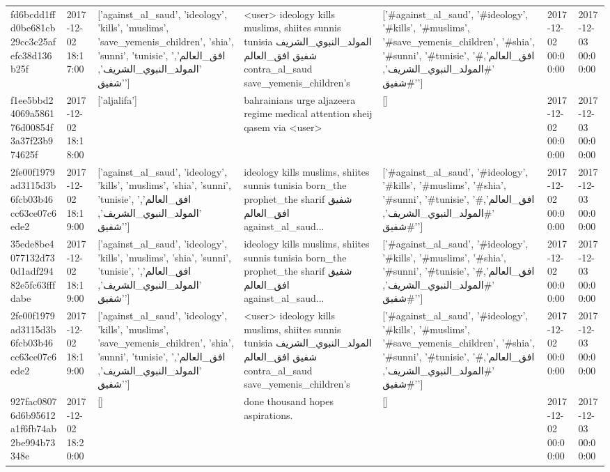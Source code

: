\begin{tabular}{lllllll}
fd6bcdd1ffd0be681cb29cc3c25afefc38d136b25f & 2017-12-02 18:17:00 & ['against_al_saud', 'ideology', 'kills', 'muslims', 'save_yemenis_children', 'shia', 'sunni', 'tunisie', 'افق_العالم', 'المولد_النبوي_الشريف', 'شفيق'] & <user> ideology kills muslims, shiites sunnis tunisia المولد\_النبوي\_الشريف شفيق افق\_العالم contra\_al\_saud save\_yemenis\_children's & ['#against_al_saud', '#ideology', '#kills', '#muslims', '#save_yemenis_children', '#shia', '#sunni', '#tunisie', '#افق_العالم', '#المولد_النبوي_الشريف', '#شفيق'] & 2017-12-02 00:00:00 & 2017-12-03 00:00:00 \\
f1ee5bbd24069a586176d00854f3a37f23b974625f & 2017-12-02 18:18:00 & ['aljalifa'] & bahrainians urge aljazeera regime medical attention sheij qasem via <user> & [] & 2017-12-02 00:00:00 & 2017-12-03 00:00:00 \\
2fe00f1979ad3115d3b6fcb03b46cc63ce07c6ede2 & 2017-12-02 18:19:00 & ['against_al_saud', 'ideology', 'kills', 'muslims', 'shia', 'sunni', 'tunisie', 'افق_العالم', 'المولد_النبوي_الشريف', 'شفيق'] & ideology kills muslims, shiites sunnis tunisia born\_the prophet\_the sharif شفيق افق\_العالم against\_al\_saud... & ['#against_al_saud', '#ideology', '#kills', '#muslims', '#shia', '#sunni', '#tunisie', '#افق_العالم', '#المولد_النبوي_الشريف', '#شفيق'] & 2017-12-02 00:00:00 & 2017-12-03 00:00:00 \\
35ede8be4077132d730d1adf29482e5fc63fffdabe & 2017-12-02 18:19:00 & ['against_al_saud', 'ideology', 'kills', 'muslims', 'shia', 'sunni', 'tunisie', 'افق_العالم', 'المولد_النبوي_الشريف', 'شفيق'] & ideology kills muslims, shiites sunnis tunisia born\_the prophet\_the sharif شفيق افق\_العالم against\_al\_saud... & ['#against_al_saud', '#ideology', '#kills', '#muslims', '#shia', '#sunni', '#tunisie', '#افق_العالم', '#المولد_النبوي_الشريف', '#شفيق'] & 2017-12-02 00:00:00 & 2017-12-03 00:00:00 \\
2fe00f1979ad3115d3b6fcb03b46cc63ce07c6ede2 & 2017-12-02 18:19:00 & ['against_al_saud', 'ideology', 'kills', 'muslims', 'save_yemenis_children', 'shia', 'sunni', 'tunisie', 'افق_العالم', 'المولد_النبوي_الشريف', 'شفيق'] & <user> ideology kills muslims, shiites sunnis tunisia المولد\_النبوي\_الشريف شفيق افق\_العالم contra\_al\_saud save\_yemenis\_children's & ['#against_al_saud', '#ideology', '#kills', '#muslims', '#save_yemenis_children', '#shia', '#sunni', '#tunisie', '#افق_العالم', '#المولد_النبوي_الشريف', '#شفيق'] & 2017-12-02 00:00:00 & 2017-12-03 00:00:00 \\
927fac08076d6b95612a1f6fb74ab2be994b73348e & 2017-12-02 18:20:00 & [] & done thousand hopes aspirations. & [] & 2017-12-02 00:00:00 & 2017-12-03 00:00:00 \\

\end{tabular}
